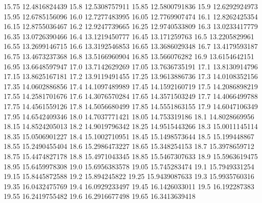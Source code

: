           15.75    12.4816824439
           15.8    12.5308757911
          15.85    12.5800791836
           15.9    12.6292924973
          15.95    12.6785156096
           16.0    12.7277483995
          16.05    12.7769907474
           16.1    12.8262425354
          16.15    12.8755036467
           16.2    12.9247739665
          16.25    12.9740533809
           16.3    13.0233417779
          16.35    13.0726390466
           16.4    13.1219450777
          16.45     13.171259763
           16.5    13.2205829961
          16.55    13.2699146715
           16.6    13.3192546853
          16.65    13.3686029348
           16.7    13.4179593187
          16.75    13.4673237368
           16.8    13.5166960904
          16.85     13.566076282
           16.9    13.6154642151
          16.95    13.6648597947
           17.0    13.7142629269
          17.05    13.7636735191
           17.1    13.8130914796
          17.15    13.8625167181
           17.2    13.9119491455
          17.25    13.9613886736
           17.3    14.0108352156
          17.35    14.0602886856
           17.4    14.1097489989
          17.45    14.1592160719
           17.5    14.2086898219
          17.55    14.2581701676
           17.6    14.3076570284
          17.65    14.3571503249
           17.7    14.4066499788
          17.75    14.4561559126
           17.8    14.5056680499
          17.85    14.5551863155
           17.9    14.6047106349
          17.95    14.6542409346
           18.0    14.7037771421
          18.05     14.753319186
           18.1    14.8028669956
          18.15    14.8524205013
           18.2    14.9019796342
          18.25    14.9515443266
           18.3    15.0011145114
          18.35    15.0506901227
           18.4    15.1002710951
          18.45    15.1498573644
           18.5     15.199448867
          18.55    15.2490455404
           18.6    15.2986473227
          18.65     15.348254153
           18.7    15.3978659712
          18.75    15.4474827178
           18.8    15.4971043345
          18.85    15.5467307633
           18.9    15.5963619475
          18.95    15.6459978308
           19.0    15.6956383578
          19.05     15.745283474
           19.1    15.7949331254
          19.15    15.8445872588
           19.2     15.894245822
          19.25    15.9439087633
           19.3    15.9935760316
          19.35    16.0432475769
           19.4    16.0929233497
          19.45    16.1426033011
           19.5     16.192287383
          19.55    16.2419755482
           19.6    16.2916677498
          19.65    16.3413639418
